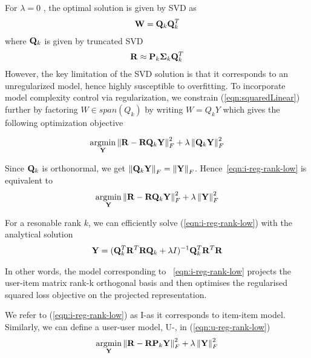 
For $\lambda = 0$ , the optimal solution is given by SVD as
   \begin{align}
   \label{eqn:SVDOptimal}
   \mathbf{W} = \mathbf{Q}_k \mathbf{Q}_k^ T
   \end{align}
where  $\mathbf{Q}_k$ is given by truncated SVD 
   \begin{align*}
   \mathbf{R} \approx \mathbf{P}_k \mathbf{\Sigma}_k \mathbf{Q}_k^T
   \end{align*}
However, the key limitation of the SVD solution is that it corresponds to an unregularized model, hence highly susceptible to overfitting. To incorporate model complexity control via regularization, we constrain (\ref{eqn:squaredLinear}) further by factoring $W\in span(Q_k)$ by writing $W = Q_k Y$ which gives the following optimization objective

\begin{align}
\label{eqn:i-reg-rank-low}
\underset{\mathbf{Y}} {\mathrm{argmin}}  \left \| \mathbf{R} - \mathbf{R} \mathbf{Q}_k \mathbf{Y} \right \|_F^2 + \lambda \left \|  \mathbf{Q}_k \mathbf{Y} \right \|_F^2 
\end{align}

Since $\mathbf{Q}_k$ is orthonormal, we get $\left \| \mathbf{Q}_k \mathbf{Y} \right \|_F = \left \|\mathbf{Y}\right \|_F$. Hence~\ref{eqn:i-reg-rank-low} is equivalent to 
\begin{align}
\underset{\mathbf{Y}}{\mathrm{argmin}} \left \| \mathbf{R} - \mathbf{R}\mathbf{Q}_k\mathbf{Y}\right \|_F^2 + \lambda \left \|  \mathbf{Y} \right \|_F^2 
\end{align}

For a resonable rank $k$, we can efficiently solve (\ref{eqn:i-reg-rank-low}) with the analytical solution 
\begin{align*}
\mathbf{Y} = (\mathbf{Q}_k^T \mathbf{R}^T\mathbf{R}\mathbf{Q}_k +\lambda I)^{-1} \mathbf{Q}_k^T \mathbf{R}^T \mathbf{R}
\end{align*}

In other words, the model corresponding to ~\ref{eqn:i-reg-rank-low} projects the user-item matrix rank-k orthogonal basis and then optimises the regularised squared loss objective on the projected representation.

We refer to (\ref{eqn:i-reg-rank-low}) as I-\LinearLow as it corresponds to item-item model. Similarly, we can define a user-user model, U-\LinearLow, in (\ref{eqn:u-reg-rank-low})
\begin{align}
\label{eqn:u-reg-rank-low}
\underset{\mathbf{Y}}{\mathrm{argmin}}  \left \| \mathbf{R} - \mathbf{R}\mathbf{P}_k\mathbf{Y}\right \|_F^2 + \lambda \left \|  \mathbf{Y} \right \|_F^2 
\end{align}

